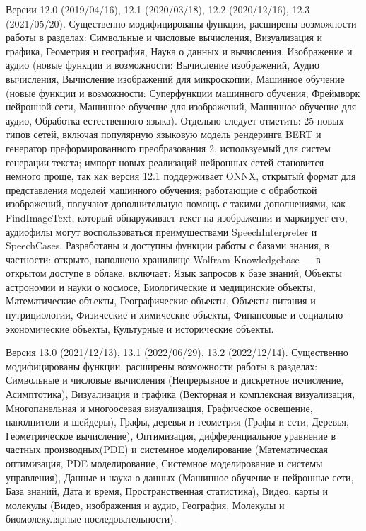 \begin{textitemize}
	\item Версии 12.0 (2019/04/16), 12.1 (2020/03/18), 12.2 (2020/12/16), 12.3 (2021/05/20). Существенно модифицированы функции, расширены возможности работы в разделах: Символьные и числовые вычисления, Визуализация и графика, Геометрия и география, Наука о данных и вычисления, Изображение и аудио (новые функции и возможности: Вычисление изображений, Аудио вычисления, Вычисление изображений для микроскопии, Машинное обучение (новые функции и возможности: Суперфункции машинного обучения, Фреймворк нейронной сети, Машинное обучение для изображений, Машинное обучение для аудио, Обработка естественного языка). Отдельно следует отметить: 25 новых типов сетей, включая популярную языковую модель рендеринга BERT и генератор преформированного преобразования 2, используемый для систем генерации текста; импорт новых реализаций нейронных сетей становится немного проще, так как версия 12.1 поддерживает ONNX, открытый формат для представления моделей машинного обучения; работающие с обработкой изображений, получают дополнительную помощь с такими дополнениями, как FindImageText, который обнаруживает текст на изображении и маркирует его, аудиофилы могут воспользоваться преимуществами SpeechInterpreter и SpeechCases. Разработаны и доступны функции работы с базами знания, в частности: открыто, наполнено хранилище Wolfram Knowledgebase --- в открытом доступе в облаке, включает: Язык запросов к базе знаний, Объекты астрономии и науки о космосе, Биологические и медицинские объекты, Математические объекты, Географические объекты, Объекты питания и нутрициологии, Физические и химические объекты, Финансовые и социально-экономические объекты, Культурные и исторические объекты.
	\item Версия 13.0 (2021/12/13), 13.1 (2022/06/29), 13.2 (2022/12/14). Существенно модифицированы функции, расширены возможности работы в разделах: Символьные и числовые вычисления (Непрерывное и дискретное исчисление, Асимптотика), Визуализация и графика (Векторная и комплексная визуализация, Многопанельная и многоосевая визуализация, Графическое освещение, наполнители и шейдеры), Графы, деревья и геометрия (Графы и сети, Деревья, Геометрическое вычисление), Оптимизация, дифференциальное уравнение в частных производных(PDE) и системное моделирование (Математическая оптимизация, PDE моделирование, Системное моделирование и системы управления), Данные и наука о данных (Машинное обучение и нейронные сети, База знаний, Дата и время, Пространственная статистика), Видео, карты и молекулы (Видео, изображения и аудио, География, Молекулы и биомолекулярные последовательности). 
\end{textitemize}

